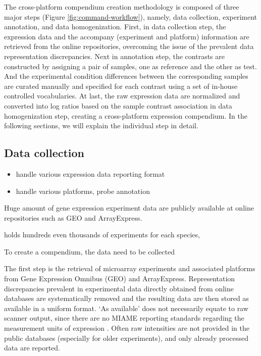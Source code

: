 The cross-platform compendium creation methodology is composed of three major 
steps (Figure \ref{fig:command-workflow}), namely, data collection, experiment 
annotation, and data homogenization. 
%
First, in data collection step, the expression data and the accompany 
(experiment and platform) information are retrieved from the online 
repositories, overcoming the issue of the prevalent data representation 
discrepancies. 
%
Next in annotation step, the contrasts are constructed by assigning a pair of 
samples, one as reference and the other as test. And the experimental 
condition differences between the corresponding samples are 
curated manually and specified for each contrast using a set of in-house 
controlled vocabularies.
%
At last, the raw expression data are normalized and converted into log 
ratios based on the sample contrast association in data homogenization step, 
creating a cross-platform expression compendium.
% 
% 
In the following sections, we will explain the individual step in detail.



\subsection{Data collection}


\begin{itemize}
\item handle various expression data reporting format
\item handle various platforms, probe annotation
\end{itemize}

Huge amount of gene expression experiment data are publicly available 
at online repositories such as GEO and ArrayExpress. 
 
holds hundreds even 
thousands 
of experiments for each species, 

To create a compendium, the data need to be collected 



The first step is the retrieval of microarray experiments and associated 
platforms from Gene Expression Omnibus (GEO) and ArrayExpress. 
Representation discrepancies prevalent in experimental data directly obtained 
from online databases are systematically removed and the resulting data are 
then stored as available in a uniform format. 
`As available' does not necessarily equate to raw scanner output, since there 
are no MIAME reporting standards regarding the measurement units of expression 
\cite{Brazma2001, Brazma2009}. 
Often raw intensities are not provided in the public databases (especially for 
older experiments), and only already processed data are reported. 

